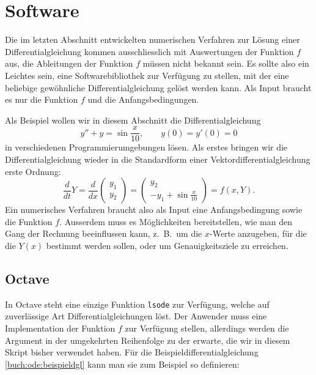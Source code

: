 %
%
%
\section{Software}
Die im letzten Abschnitt entwickelten numerischen Verfahren zur Lösung
einer Differentialgleichung kommen ausschliesslich mit Auswertungen der
Funktion $f$ aus, die Ableitungen der Funktion $f$ müssen nicht bekannt
sein.
Es sollte also ein Leichtes sein, eine Softwarebibliothek zur
Verfügung zu stellen, mit der eine beliebige gewöhnliche
Differentialgleichung gelöst werden kann.
Als Input braucht es nur die Funktion $f$ und die Anfangsbedingungen.

Als Beispiel wollen wir in diesem Abschnitt die Differentialgleichung
\[
y''+y=\sin \frac{x}{10},\qquad y(0)=y'(0)=0
\]
in verschiedenen Programmierumgebungen lösen.
Als erstes bringen wir die Differentialgleichung wieder in die Standardform
einer Vektordifferentialgleichung erste Ordnung:
\begin{equation}
\frac{d}{dt}Y
=
\frac{d}{dx}\begin{pmatrix}y_1\\y_2\end{pmatrix}
=
\begin{pmatrix}
y_2\\
\displaystyle -y_1+\sin\frac{x}{10}
\end{pmatrix}
=
f(x,Y).
\label{buch:ode:beispieldgl}
\end{equation}
Ein numerisches Verfahren braucht also als Input eine Anfangsbedingung
sowie die Funktion $f$.
Ausserdem muss es Möglichkeiten bereitstellen, wie man den Gang der
Rechnung beeinflussen kann, z.~B.~um die $x$-Werte anzugeben, für die
die $Y(x)$ bestimmt werden sollen, oder um Genauigkeitsziele zu erreichen.

\subsection{Octave}
%
In Octave steht eine einzige Funktion \texttt{lsode} zur Verfügung, welche
auf zuverlässige Art Differentialgleichungen löst.
Der Anwender muss eine Implementation der Funktion $f$ zur Verfügung
stellen, allerdings werden die Argument in der umgekehrten Reihenfolge
zu der erwarte, die wir in diesem Skript bisher verwendet haben.
Für die Beispieldifferentialgleichung \eqref{buch:ode:beispieldgl}
kann man sie zum Beispiel so definieren:


